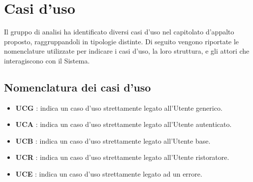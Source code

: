 \section{Casi d'uso}

Il gruppo di analisi ha identificato diversi casi d'uso nel capitolato d'appalto proposto, raggruppandoli in tipologie distinte. 
Di seguito vengono riportate le nomenclature utilizzate per indicare i casi d'uso, la loro struttura, e gli attori che interagiscono con il Sistema.

\subsection{Nomenclatura dei casi d'uso}
\begin{itemize}
	\item \textbf{UCG} : indica un caso d'uso strettamente legato all'Utente generico.
	\item \textbf{UCA} : indica un caso d'uso strettamente legato all'Utente autenticato.
	\item \textbf{UCB} : indica un caso d'uso strettamente legato all'Utente base.
	\item \textbf{UCR} : indica un caso d'uso strettamente legato all'Utente ristoratore.
	\item \textbf{UCE} : indica un caso d'uso strettamente legato ad un errore.
\end{itemize}
